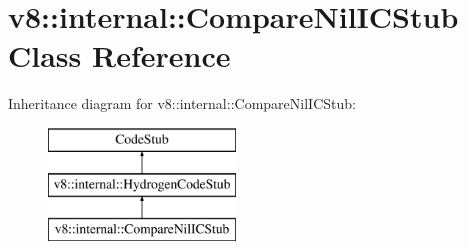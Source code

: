 \hypertarget{classv8_1_1internal_1_1_compare_nil_i_c_stub}{}\section{v8\+:\+:internal\+:\+:Compare\+Nil\+I\+C\+Stub Class Reference}
\label{classv8_1_1internal_1_1_compare_nil_i_c_stub}
Inheritance diagram for v8\+:\+:internal\+:\+:Compare\+Nil\+I\+C\+Stub\+:\begin{figure}[H]
\begin{center}
\leavevmode
\includegraphics[height=3.000000cm]{classv8_1_1internal_1_1_compare_nil_i_c_stub}
\end{center}
\end{figure}
